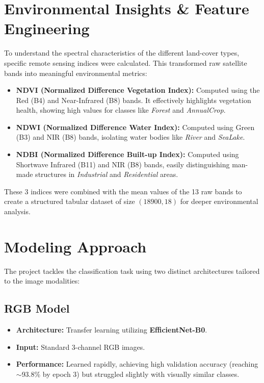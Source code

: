 \documentclass[11pt,a4paper]{article}
\begin{document}
\section{Environmental Insights \& Feature Engineering}
To understand the spectral characteristics of the different land-cover types, specific remote sensing indices were calculated. This transformed raw satellite bands into meaningful environmental metrics:

\begin{itemize}
    \item \textbf{NDVI (Normalized Difference Vegetation Index):} Computed using the Red (B4) and Near-Infrared (B8) bands. It effectively highlights vegetation health, showing high values for classes like \textit{Forest} and \textit{AnnualCrop}.
    \item \textbf{NDWI (Normalized Difference Water Index):} Computed using Green (B3) and NIR (B8) bands, isolating water bodies like \textit{River} and \textit{SeaLake}.
    \item \textbf{NDBI (Normalized Difference Built-up Index):} Computed using Shortwave Infrared (B11) and NIR (B8) bands, easily distinguishing man-made structures in \textit{Industrial} and \textit{Residential} areas.
\end{itemize}

These 3 indices were combined with the mean values of the 13 raw bands to create a structured tabular dataset of size $(18900, 18)$ for deeper environmental analysis.

\section{Modeling Approach}
The project tackles the classification task using two distinct architectures tailored to the image modalities:

\subsection{RGB Model}
\begin{itemize}
    \item \textbf{Architecture:} Transfer learning utilizing \textbf{EfficientNet-B0}.
    \item \textbf{Input:} Standard 3-channel RGB images.
    \item \textbf{Performance:} Learned rapidly, achieving high validation accuracy (reaching $\sim$93.8\% by epoch 3) but struggled slightly with visually similar classes.
\end{itemize}
\end{document}
